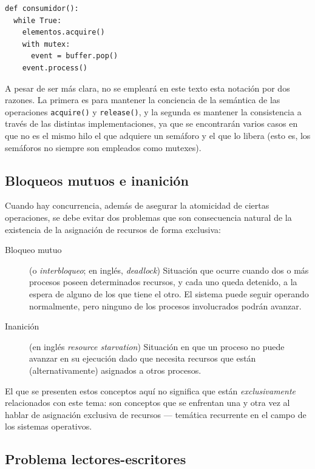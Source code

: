\documentclass[11pt,fleqn]{book} %
\begin{document}
\begin{verbatim}
def consumidor():
  while True:
    elementos.acquire()
    with mutex:
      event = buffer.pop()
    event.process()
\end{verbatim}

   A pesar de ser más clara, no se empleará en este texto esta notación
   por dos razones. La primera es para mantener la conciencia de la
   semántica de las operaciones \texttt{acquire()} y \texttt{release()}, y la segunda
   es mantener la consistencia a través de las distintas
   implementaciones, ya que se encontrarán varios casos en que no es el
   mismo hilo el que adquiere un semáforo y el que lo libera (esto es,
   los semáforos no siempre son empleados como mutexes).
\subsection{Bloqueos mutuos e inanición}
\label{sec-3-3-5}


Cuando hay concurrencia, además de asegurar la atomicidad de ciertas
operaciones, se debe evitar dos problemas que son consecuencia natural
de la existencia de la asignación de recursos de forma exclusiva:

\begin{description}
\item[Bloqueo mutuo] (o \emph{interbloqueo}; en inglés, \emph{deadlock}) Situación
                   que ocurre cuando dos o más procesos poseen
                   determinados recursos, y cada uno queda detenido, a
                   la espera de alguno de los que tiene el otro. El
                   sistema puede seguir operando normalmente, pero
                   ninguno de los procesos involucrados podrán
                   avanzar.
\item[Inanición] (en inglés \emph{resource starvation}) Situación en que un
	       proceso no puede avanzar en su ejecución dado que necesita
	       recursos que están (alternativamente) asignados a
	       otros procesos.
\end{description}

El que se presenten estos conceptos aquí no significa que están
\emph{exclusivamente} relacionados con este tema: son conceptos que
se enfrentan una y otra vez al hablar de asignación exclusiva de
recursos — temática recurrente en el campo de los sistemas operativos.
\subsection{Problema lectores-escritores}
\label{sec-3-3-6}
\end{document}
